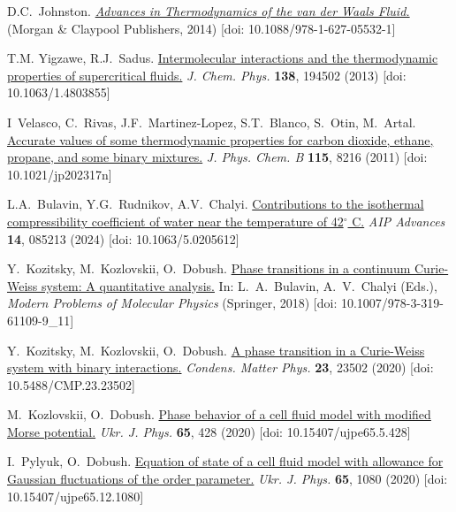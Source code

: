 \begin{thebibliography}{9}
	
	 D.C.~Johnston.
	\textit{\href{https://dx.doi.org/10.1088/978-1-627-05532-1}{Advances in Thermodynamics of the van der {W}aals Fluid.}} (Morgan \& Claypool Publishers, 2014) [doi: 10.1088/978-1-627-05532-1]
	
	 T.M. Yigzawe, R.J.~Sadus.
	\href{https://doi.org/10.1063/1.4803855}{Intermolecular interactions and the thermodynamic properties of supercritical fluids.} \textit{J. Chem. Phys.} \textbf{138}, 194502 (2013) [doi: 10.1063/1.4803855]
		
	 I~Velasco, C.~Rivas, J.F.~Martinez-Lopez, S.T.~Blanco, S.~Otin, M.~Artal.
	\href{https://pubs.acs.org/doi/abs/10.1021/jp202317n}{Accurate values of some thermodynamic properties for carbon dioxide, ethane, propane, and some binary mixtures.} \textit{J. Phys. Chem. B} \textbf{115}, 8216 (2011) [doi: 10.1021/jp202317n] 
	
	 L.A.~Bulavin, Y.G.~Rudnikov, A.V.~Chalyi.
	\href{https://pubs.aip.org/aip/adv/article/14/8/085213/3307287}{Contributions to the isothermal compressibility coefficient of water near the temperature of 42$^{\circ}$ C.} \textit{AIP Advances} \textbf{14}, 085213 (2024) [doi: 10.1063/5.0205612] 
	
	 Y.~Kozitsky, M.~Kozlovskii, O.~Dobush.
	\href{https://link.springer.com/chapter/10.1007/978-3-319-61109-9_11}{Phase transitions in a continuum Curie-Weiss system: A quantitative analysis.} In: L.~A.~Bulavin, A.~V.~Chalyi (Eds.), \textit{Modern Problems of Molecular Physics} (Springer, 2018) [doi: 10.1007/978-3-319-61109-9\_11]
		
	 Y.~Kozitsky, M.~Kozlovskii, O.~Dobush.
	\href{https://icmp.lviv.ua/journal/zbirnyk.102/23502/abstract.html}{A phase transition in a Curie-Weiss system with binary interactions.} \textit{Condens.
	Matter Phys.} \textbf{23}, 23502 (2020) [doi: 10.5488/CMP.23.23502]
	
	 M.~Kozlovskii, O.~Dobush.
	\href{https://ujp.bitp.kiev.ua/index.php/ujp/article/view/2019631}{Phase
	behavior of a cell fluid model with modified Morse potential.} \textit{Ukr. J. Phys.} \textbf{65}, 428 (2020) [doi: 10.15407/ujpe65.5.428]
	
	 I.~Pylyuk, O.~Dobush. \href{https://ujp.bitp.kiev.ua/index.php/ujp/article/view/2020185}{Equation of state of a cell fluid model with allowance for Gaussian fluctuations of the order parameter.} \textit{Ukr. J. Phys.} \textbf{65}, 1080 (2020) [doi: 10.15407/ujpe65.12.1080]
	

\end{thebibliography}
